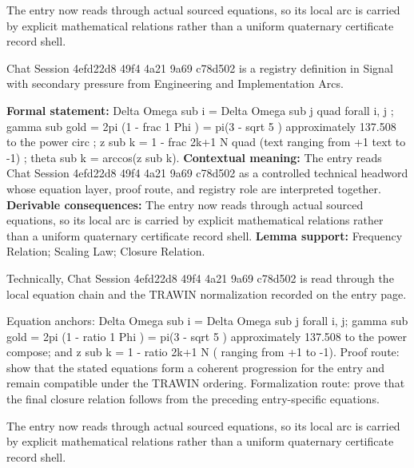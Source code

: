 The entry now reads through actual sourced equations, so its local arc is carried by explicit mathematical relations rather than a uniform quaternary certificate record shell.
\clearpage


\begingroup\small
{}
Chat Session 4efd22d8 49f4 4a21 9a69 c78d502 is a registry definition in Signal with secondary pressure from Engineering and Implementation Arcs.

\begingroup\footnotesize\setlength{\emergencystretch}{3em}\sloppy
\textbf{Formal statement:} Delta Omega sub i = Delta Omega sub j quad forall i, j ; gamma sub gold = 2pi (1 - frac 1 Phi ) = pi(3 - sqrt 5 ) approximately 137.508 to the power circ ; z sub k = 1 - frac 2k+1 N quad (text ranging from +1 text to -1) ; theta sub k = arccos(z sub k). \textbf{Contextual meaning:} The entry reads Chat Session 4efd22d8 49f4 4a21 9a69 c78d502 as a controlled technical headword whose equation layer, proof route, and registry role are interpreted together. \textbf{Derivable consequences:} The entry now reads through actual sourced equations, so its local arc is carried by explicit mathematical relations rather than a uniform quaternary certificate record shell. \textbf{Lemma support:} Frequency Relation; Scaling Law; Closure Relation.\par
\endgroup

Technically, Chat Session 4efd22d8 49f4 4a21 9a69 c78d502 is read through the local equation chain and the TRAWIN normalization recorded on the entry page.

Equation anchors: Delta Omega sub i = Delta Omega sub j forall i, j; gamma sub gold = 2pi (1 - ratio 1 Phi ) = pi(3 - sqrt 5 ) approximately 137.508 to the power compose; and z sub k = 1 - ratio 2k+1 N ( ranging from +1 to -1). Proof route: show that the stated equations form a coherent progression for the entry and remain compatible under the TRAWIN ordering. Formalization route: prove that the final closure relation follows from the preceding entry-specific equations.

The entry now reads through actual sourced equations, so its local arc is carried by explicit mathematical relations rather than a uniform quaternary certificate record shell.
\endgroup

